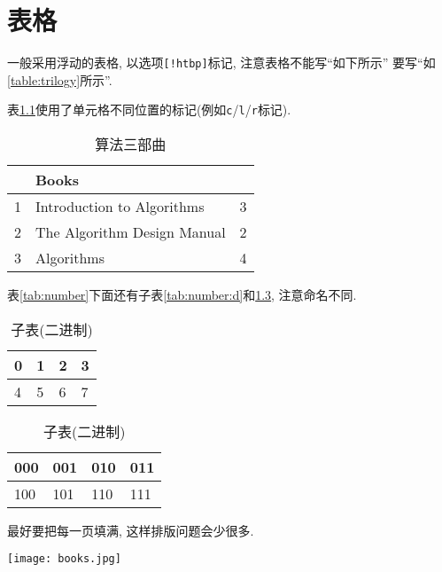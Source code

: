 \chapter{表格}


  一般采用浮动的表格, 以选项\texttt{[!htbp]}标记, 注意表格不能写``如下所示''
要写``如\ref{table:trilogy}所示''.


  表\ref{tab:trilogy}使用了单元格不同位置的标记(例如\texttt{c}/\texttt{l}/\texttt{r}标记).

\begin{table}[!hbtp]
\centering
\begin{tabular}{|c|l|r|}
\hline
    & Books                         &     \\ \hline
1   & Introduction to Algorithms    & 3 \\
2   & The Algorithm Design Manual   & 2 \\
3   & Algorithms                    & 4 \\
\hline
\end{tabular}
\caption{算法三部曲}
\label{tab:trilogy}
\end{table}


  表\ref{tab:number}下面还有子表\ref{tab:number:d}和\ref{tab:number:b}, 注意命名不同.

\begin{table}[!htb]
\centering
  \caption{主表}
  \label{tab:number}
\begin{subtable}[t]{2in}
  \centering
  \begin{tabular}{|l|l|l|l|}
  \hline
  0 & 1 & 2 & 3 \\
  \hline
  4 & 5 & 6 & 7 \\
  \hline
  \end{tabular}
  \caption{子表(十进制)}\label{tab:number:d}
\end{subtable}
\quad
\begin{subtable}[t]{2in}
  \centering
  \begin{tabular}{|l|l|l|l|}
  \hline
  000 & 001 & 010 & 011 \\
  \hline
  100 & 101 & 110 & 111 \\
  \hline
  \end{tabular}
  \caption{子表(二进制)}\label{tab:number:b}
\end{subtable}
\end{table}

最好要把每一页填满, 这样排版问题会少很多.

\begin{table}[h]
    \centering
    \texttt{[image: books.jpg]}
    \caption{算法三部曲}
\end{table}
